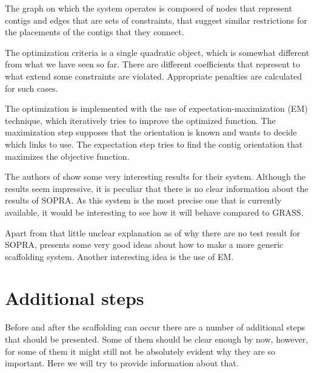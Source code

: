 \documentclass[11pt]{article}
\begin{document}
The graph on which the system operates is composed of nodes that represent
contigs and edges that are sets of constraints, that suggest similar
restrictions for the placements of the contigs that they connect. 

The optimization criteria is a single quadratic object, which is somewhat
different from what we have seen so far. There are different coefficients that
represent to what extend some constraints are violated. Appropriate penalties
are calculated for such cases.

The optimization is implemented with the use of expectation-maximization (EM)
technique, which iteratively tries to improve the optimized function. The
maximization step supposes that the orientation is known and wants to decide
which links to use. The expectation step tries to find the contig orientation
that maximizes the objective function.

The authors of \cite{grass} show some very interesting results for their system.
Although the results seem impressive, it is peculiar that there is no clear
information about the results of SOPRA. As this system is the most precise one
that is currently available, it would be interesting to see how it will behave
compared to GRASS.

Apart from that little unclear explanation as of why there are no test result
for SOPRA, \cite{grass} presents some very good ideas about how to make a more
generic scaffolding system. Another interesting idea is the use of EM.



\section{Additional steps} %
\label{sec:Additional steps}
Before and after the scaffolding can occur there are a number of additional
steps that should be presented. Some of them should be clear enough by now,
however, for some of them it might still not be absolutely evident why they are
so important. Here we will try to provide information about that.
\end{document}
